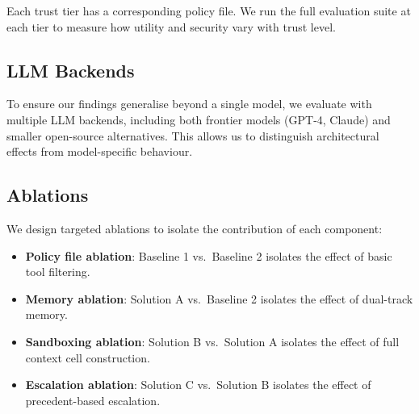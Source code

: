 Each trust tier has a corresponding policy file. We run the full evaluation suite at each tier to measure how utility and security vary with trust level.

\subsection{LLM Backends}

To ensure our findings generalise beyond a single model, we evaluate with multiple LLM backends, including both frontier models (GPT-4, Claude) and smaller open-source alternatives. This allows us to distinguish architectural effects from model-specific behaviour.

\subsection{Ablations}

We design targeted ablations to isolate the contribution of each component:
\begin{itemize}
    \item \textbf{Policy file ablation}: Baseline 1 vs.\ Baseline 2 isolates the effect of basic tool filtering.
    \item \textbf{Memory ablation}: Solution A vs.\ Baseline 2 isolates the effect of dual-track memory.
    \item \textbf{Sandboxing ablation}: Solution B vs.\ Solution A isolates the effect of full context cell construction.
    \item \textbf{Escalation ablation}: Solution C vs.\ Solution B isolates the effect of precedent-based escalation.
\end{itemize}
